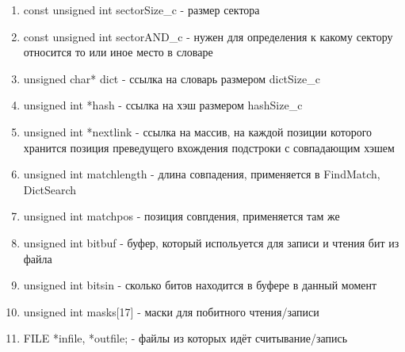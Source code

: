 \documentclass[12pt]{article}
\begin{document}
\begin{enumerate}
	\item const unsigned int sectorSize\_c	- размер сектора
	\item const unsigned int sectorAND\_c	- нужен для определения к какому сектору относится то или иное место в словаре
	\item unsigned char* dict - ссылка на словарь размером dictSize\_c
	\item unsigned int *hash - ссылка на хэш размером hashSize\_c
	\item unsigned int *nextlink - ссылка на массив, на каждой позиции которого хранится позиция преведущего вхождения подстроки с совпадающим хэшем
	\item unsigned int matchlength - длина совпадения, применяется в FindMatch, DictSearch
	\item unsigned int	matchpos - позиция совпдения, применяется там же
	\item unsigned int	bitbuf - буфер, который испольуется для записи и чтения бит из файла
	\item unsigned int	bitsin - сколько битов находится в буфере в данный момент
	\item unsigned int	masks[17] - маски для побитного чтения/записи
    \item FILE *infile, *outfile; - файлы из которых идёт считывание/запись
\end{enumerate}
\end{document}
